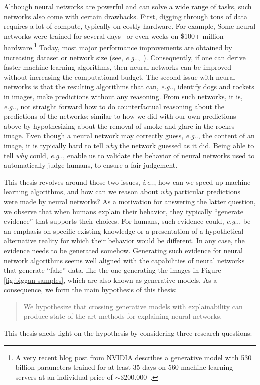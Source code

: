 \documentclass[11pt,a4paper,twoside,openright,final]{memoir}
\makeatletter
\DeclareRobustCommand\onedot{\futurelet\@let@token\@onedot}
\def\@onedot{\ifx\@let@token.\else.\null\fi\xspace}
\def\eg{\emph{e.g}\onedot} \def\Eg{\emph{E.g}\onedot}
\def\ie{\emph{i.e}\onedot} \def\Ie{\emph{I.e}\onedot}
\makeatother
\begin{document}
Although neural networks are powerful and can solve a wide range of tasks, such networks also come with certain drawbacks.
First, digging through tons of data requires a lot of compute, typically on costly hardware.
For example, Some neural networks were trained for several days~\cite{alexnet, alphafold} or even weeks on \$100+ million hardware.\footnote{A very recent blog post from NVIDIA describes a generative model with 530 billion parameters trained for at least 35 days on 560 machine learning servers at an individual price of $\sim$\$200.000~\cite{nvidia-bigass-mofo}.}
Today, most major performance improvements are obtained by increasing dataset or network size (see, \eg,~\cite{gpt-3}).
Consequently, if one can derive faster machine learning algorithms, then neural networks can be improved without increasing the computational budget.
The second issue with neural networks is that the resulting algorithms that can, \eg, identify dogs and rockets in images, make predictions without any reasoning.
From such networks, it is, \eg, not straight forward how to do counterfactual reasoning about the predictions of the networks; 
similar to how we did with our own predictions above by hypothesizing about the removal of smoke and glare in the rockes image.
Even though a neural network may correctly guess, \eg, the content of an image, it is typically hard to tell \emph{why} the network guessed as it did.
Being able to tell \emph{why} could, \eg, enable us to validate the behavior of neural networks used to automatically judge humans, to ensure a fair judgement.

This thesis revolves around those two issues, \ie, how can we speed up machine learning algorithms, and how can we reason about \emph{why} particular predictions were made by neural networks? 
As a motivation for answering the latter question, we observe that when humans explain their behavior, they typically ``generate evidence'' that supports their choices.
For humans, such evidence could, \eg, be an emphasis on specific existing knowledge or a presentation of a hypothetical alternative reality for which their behavior would be different.
In any case, the evidence needs to be generated somehow.
Generating such evidence for neural network algorithms seems well aligned with the capabilities of neural networks that generate ``fake'' data, like the one generating the images in Figure \ref{fig:biggan-samples}, which are also known as generative models. 
As a consequence, we form the main hypothesis of this thesis:
%
\begin{quote}
    We hypothesize that crossing generative models with explainability can produce state-of-the-art methods for explaining neural networks. 
\end{quote}
%
This thesis sheds light on the hypothesis by considering three research questions:
\end{document}
